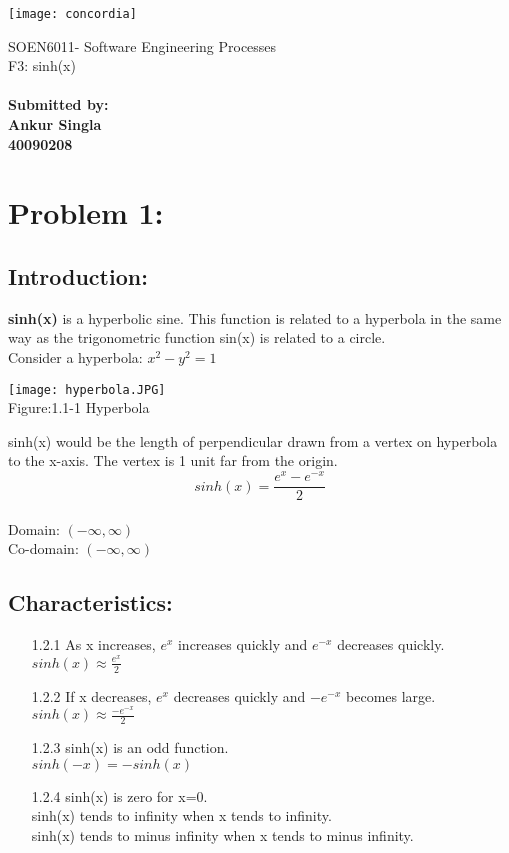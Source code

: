 \documentclass{article}
\begin{document}
\texttt{[image: concordia]}
\begin{small}
\Large SOEN6011- Software Engineering Processes\\
\linebreak
F3: sinh(x)\\
\vspace{110mm}\\
\textbf{Submitted by:}\\
\textbf{Ankur Singla}\\
\textbf{40090208}\\
\end{small}
\newpage
\tableofcontents
\newpage
\section{Problem 1:}
\subsection{Introduction:}
\textbf{sinh(x)} is a hyperbolic sine. This function is related to a hyperbola in the same way as the trigonometric function sin(x) is related to a circle.\\
Consider a hyperbola:  $x^2-y^2=1$\\

\begin{center}
\texttt{[image: hyperbola.JPG]}\\
\caption{Figure:1.1-1 Hyperbola}
\end{center}
\begin{small}
sinh(x) would be the length of perpendicular drawn from a vertex on hyperbola to the x-axis. The vertex is 1 unit far from the origin.\\
\[sinh(x)=\frac {e^x-e^{-x}}{2}\]\\
Domain: $(-\infty,\infty)$\\
Co-domain: $(-\infty,\infty)$\\
\end{small}

\subsection{ Characteristics:}
\begin{itemize}
\item [1.2.1]As x increases, $e^x$ increases quickly and $e^{−x}$ decreases quickly.\\
$sinh(x) \approx \frac{e^x}{2}$
\item [1.2.2]If x decreases, $e^x$ decreases quickly and $-e^{−x}$ becomes large.\\
$sinh(x) \approx \frac{- e^{-x}}{2}$
\item [1.2.3]sinh(x) is an odd function.\\
$sinh(−x) = −sinh(x)$
\item [1.2.4]sinh(x) is zero for x=0.\\ sinh(x) tends to infinity when x tends to infinity.\\ sinh(x) tends to minus infinity when x tends to minus infinity.
\end{itemize}
\end{document}
